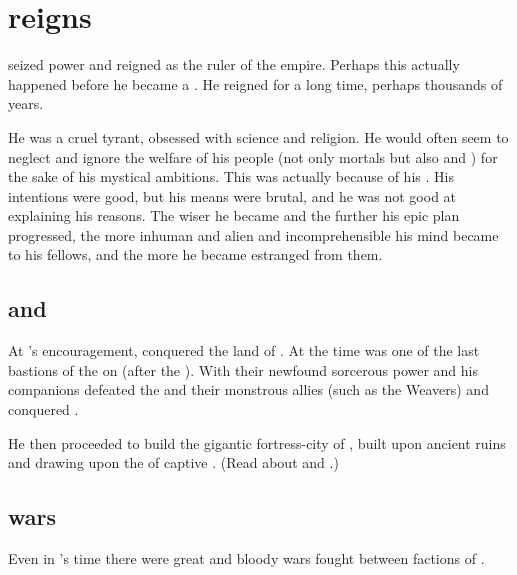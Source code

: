\section{\Sethicus reigns}
\Sethicus seized power and reigned as the ruler of the \ophidian empire. 
Perhaps this actually happened before he became a \dragon. 
He reigned for a long time, perhaps thousands of years. 

He was a cruel tyrant, obsessed with science and religion. 
He would often seem to neglect and ignore the welfare of his people (not only mortals but also \ophidians and \dragons) for the sake of his mystical ambitions. 
This was actually because of his . 
His intentions were good, but his means were brutal, and he was not good at explaining his reasons. 
The wiser he became and the further his epic plan progressed, the more inhuman and alien and incomprehensible his mind became to his fellows, and the more he became estranged from them. 









\subsection{\Nom and \Baltherium}
At \Achamoth's encouragement, \Sethicus conquered the land of \Nom. 
At the time \Nom was one of the last bastions of the \shugul on \Miith (after the \ophidians {}). 
With their newfound sorcerous power \Sethicus and his companions defeated the \shugul and their monstrous allies (such as the Weavers) and conquered \Nom. 

He then proceeded to build the gigantic fortress-city of , built upon ancient \shugul ruins and drawing upon the \dweomers of captive \moongods. 
(Read about \Baltherium and \Nom.)









\subsection{\Dragon wars}
Even in \Sethicus's time there were great and bloody wars fought between factions of \dragons.

